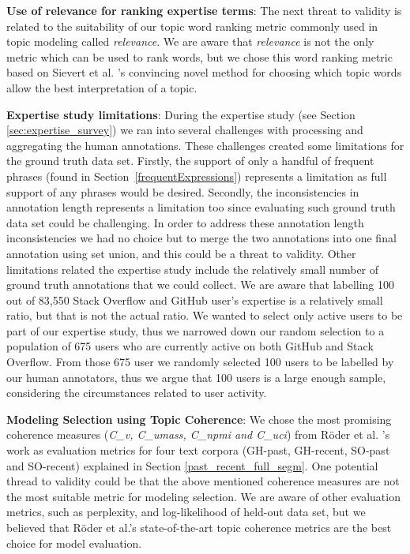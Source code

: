         \textbf{Use of relevance for ranking expertise terms}: The next threat to validity is related to the suitability of our topic word ranking metric commonly used in topic modeling called \emph{relevance}\cite{sievert2014ldavis}. We are aware that \emph{relevance} is not the only metric which can be used to rank words, but we chose this word ranking metric based on Sievert et al. \cite{sievert2014ldavis}'s convincing novel method for choosing which topic words allow the best interpretation of a topic. 
        
        \textbf{Expertise study limitations}: During the expertise study (see Section \ref{sec:expertise_survey}) we ran into several challenges with processing and aggregating the human annotations. These challenges created some limitations for the ground truth data set. Firstly, the support of only a handful of frequent phrases (found in Section~\ref{frequentExpressions}) represents a limitation as full support of any phrases would be desired. Secondly, the inconsistencies in annotation length represents a limitation too since evaluating such ground truth data set could be challenging. In order to address these annotation length inconsistencies we had no choice but to merge the two annotations into one final annotation using set union, and this could be a threat to validity. Other limitations related the expertise study include the relatively small number of ground truth annotations that we could collect. We are aware that labelling 100 out of 83,550 Stack Overflow and GitHub user's expertise is a relatively small ratio, but that is not the actual ratio. We wanted to select only active users to be part of our expertise study, thus we narrowed down our random selection to a population of 675 users who are currently active on both GitHub and Stack Overflow. From those 675 user we randomly selected 100 users to be labelled by our human annotators, thus we argue that 100 users is a large enough sample, considering the circumstances related to user activity.
        
        \textbf{Modeling Selection using Topic Coherence}: We chose the most promising coherence measures (\emph{C\_v, C\_umass, C\_npmi and C\_uci}) from R{\"o}der et al. \cite{roder2015exploring}'s work as evaluation metrics for four text corpora (GH-past, GH-recent, SO-past and SO-recent) explained in Section \ref{past_recent_full_segm}. One potential thread to validity could be that the above mentioned coherence measures are not the most suitable metric for modeling selection. We are aware of other evaluation metrics, such as perplexity, and log-likelihood of held-out data set, but we believed that R{\"o}der et al.'s state-of-the-art topic coherence metrics are the best choice for model evaluation.
        
